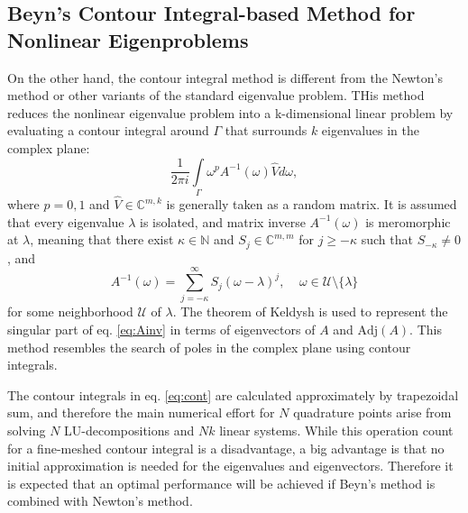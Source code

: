 \documentclass[11pt,letterpaper]{article}
\begin{document}
\begin{multicols}{2}
\subsection*{Beyn's Contour Integral-based Method for Nonlinear Eigenproblems}
On the other hand, the contour integral method is different from the Newton's method or other variants of the standard eigenvalue problem. THis method reduces the nonlinear eigenvalue problem into a k-dimensional linear problem by evaluating a contour integral around $\Gamma$ that surrounds $k$ eigenvalues in the complex plane:
\begin{equation}\label{eq:cont}
\frac{1}{2\pi i}\int\limits_{\Gamma}\omega^p A^{-1}(\omega)\hat{V}d\omega,
\end{equation}
where $p=0,1$ and $\hat{V} \in \mathbb{C}^{m,k}$ is generally taken as a random matrix. It is assumed that every eigenvalue $\lambda$ is isolated, and matrix inverse $A^{-1}(\omega)$ is meromorphic at $\lambda$, meaning that there exist $\kappa\in\mathbb{N}$ and $S_j\in \mathbb{C}^{m,m}$ for $j\geq -\kappa$ such that $S_{-\kappa}\neq 0$, and 
\begin{equation}\label{eq:Ainv}
A^{-1}(\omega)=\sum\limits_{j=-\kappa}^{\infty} S_j (\omega-\lambda)^j,\;\;
\;\; \omega \in \mathcal{U} \setminus \lbrace\lambda\rbrace 
\end{equation}
for some neighborhood $\mathcal{U}$ of $\lambda$. The theorem of Keldysh\citep{keldysh1951characteristic} is used to represent the singular part of eq. \ref{eq:Ainv} in terms of eigenvectors of $A$ and $\mathrm{Adj}(A)$. This method resembles the search of poles in the complex plane using contour integrals. 

The contour integrals in eq. \ref{eq:cont} are calculated approximately by trapezoidal sum, and therefore the main numerical effort for $N$ quadrature points arise from solving $N$ LU-decompositions and $Nk$ linear systems. While this operation count for a fine-meshed contour integral is a disadvantage, a big advantage is that no initial approximation is needed for the eigenvalues and eigenvectors. Therefore it is expected that an optimal performance will be achieved if Beyn's method is combined with Newton's method. 



\end{multicols}
\end{document}
